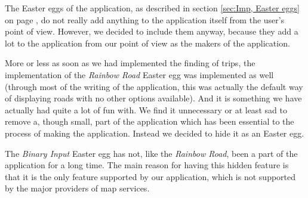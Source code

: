 The Easter eggs of the application, as described in section \ref{sec:Imp, Easter eggs} on page \pageref{sec:Imp, Easter eggs}, do not really add anything to the application itself from the user's point of view. However, we decided to include them anyway, because they add a lot to the application from our point of view as the makers of the application.

More or less as soon as we had implemented the finding of trips, the implementation of the \textit{Rainbow Road} Easter egg was implemented as well (through most of the writing of the application, this was actually the default way of displaying roads with no other options available). And it is something we have actually had quite a lot of fun with. We find it unnecessary or at least sad to remove a, though small, part of the application which has been essential to the process of making the application. Instead we decided to hide it as an Easter egg.

The \textit{Binary Input} Easter egg has not, like the \textit{Rainbow Road}, been a part of the application for a long time. The main reason for having this hidden feature is that it is the only feature supported by our application, which is not supported by the major providers of map services.